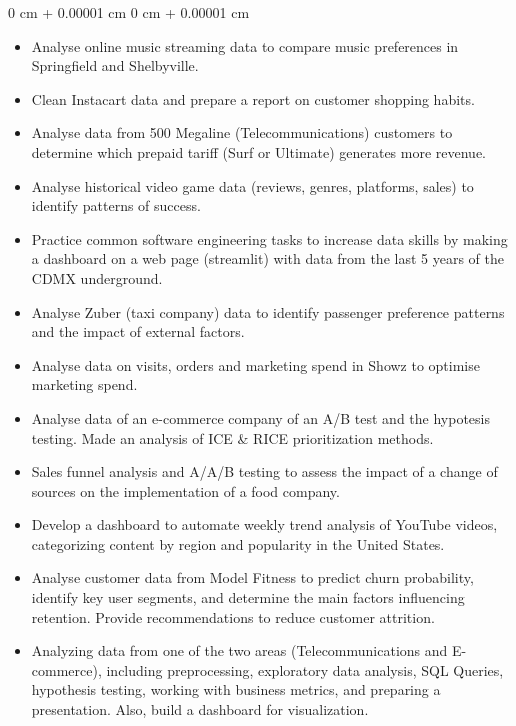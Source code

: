 \documentclass[10pt, a4paper]{article}
\newenvironment{highlights}{
    \begin{itemize}[
        topsep=0.10 cm,
        parsep=0.10 cm,
        partopsep=0pt,
        itemsep=0pt,
        leftmargin=0 cm + 10pt
    ]
}{
    \end{itemize}
} %
\newenvironment{onecolentry}{
    \begin{adjustwidth}{
        0 cm + 0.00001 cm
    }{
        0 cm + 0.00001 cm
    }
}{
    \end{adjustwidth}
} %
\begin{document}
        \vspace{0.10 cm}
        \begin{onecolentry}
            \begin{highlights}
                \item Analyse online music streaming data to compare music preferences in Springfield and Shelbyville.
                \item Clean Instacart data and prepare a report on customer shopping habits.
                \item Analyse data from 500 Megaline (Telecommunications) customers to determine which prepaid tariff (Surf or Ultimate) generates more revenue.
                \item Analyse historical video game data (reviews, genres, platforms, sales) to identify patterns of success.
                \item Practice common software engineering tasks to increase data skills by making a dashboard on a web page (streamlit) with data from the last 5 years of the CDMX underground.
                \item Analyse Zuber (taxi company) data to identify passenger preference patterns and the impact of external factors.
                \item Analyse data on visits, orders and marketing spend in Showz to optimise marketing spend.
                \item Analyse data of an e-commerce company of an A/B test and the hypotesis testing. Made an analysis of ICE \& RICE prioritization methods.
                \item Sales funnel analysis and A/A/B testing to assess the impact of a change of sources on the implementation of a food company.
                \item Develop a dashboard to automate weekly trend analysis of YouTube videos, categorizing content by region and popularity in the United States.
                \item Analyse customer data from Model Fitness to predict churn probability, identify key user segments, and determine the main factors influencing retention. Provide recommendations to reduce customer attrition.
                \item Analyzing data from one of the two areas (Telecommunications and E-commerce), including preprocessing, exploratory data analysis, SQL Queries, hypothesis testing, working with business metrics, and preparing a presentation. Also, build a dashboard for visualization.
            \end{highlights}
        \end{onecolentry}
\end{document}
